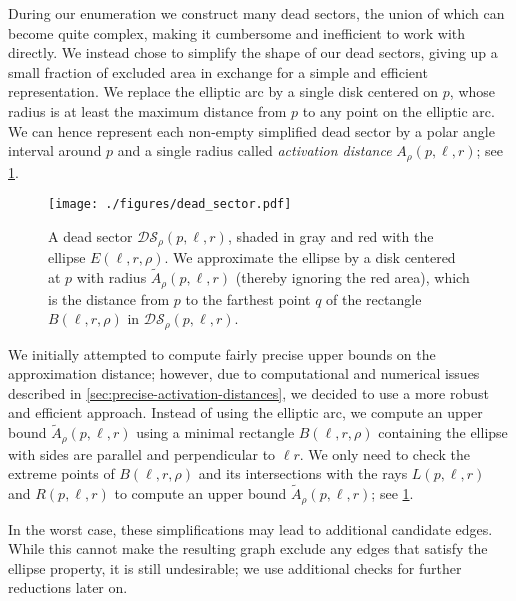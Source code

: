During our enumeration we construct many dead sectors,
the union of which can become quite complex, making it cumbersome and inefficient to work with directly.
We instead chose to simplify the shape of our dead sectors, giving up 
a small fraction of excluded area in exchange for a simple and efficient representation.
We replace the elliptic arc by a single disk centered on $p$,
whose radius is at least the maximum distance from $p$ to any point on the elliptic arc.
We can hence represent each non-empty simplified dead sector by a polar angle interval around $p$ 
and a single radius called \emph{activation distance} $A_{\rho}(p,\ell,r)$; see \cref{fig:dead-sector-construction}.

\begin{figure}
  \centering
  \texttt{[image: ./figures/dead\_sector.pdf]}
  \caption{A dead sector $\mathcal{DS}_{\rho}(p, \ell, r)$, 
  shaded in gray and red with the ellipse $E(\ell, r, \rho)$.
  We approximate the ellipse by a disk centered at $p$ with radius $\tilde{A}_{\rho}(p,\ell,r)$ (thereby ignoring the red area),
  which is the distance from $p$ to the farthest point $q$ of the rectangle 
  $B(\ell, r, \rho)$ in $\mathcal{DS}_{\rho}(p, \ell, r)$.}
  \label{fig:dead-sector-construction}
\end{figure}

We initially attempted to compute fairly precise upper bounds on the approximation distance;
however, due to computational and numerical issues described in \cref{sec:precise-activation-distances},
we decided to use a more robust and efficient approach.
Instead of using the elliptic arc,
we compute an upper bound $\tilde{A}_{\rho}(p,\ell,r)$ using a minimal rectangle $B(\ell, r, \rho)$ containing the ellipse with sides are parallel and perpendicular to $\ell r$.
We only need to check the extreme points of $B(\ell, r, \rho)$ and its intersections with the rays $L(p,\ell,r)$ and $R(p,\ell,r)$ to compute an upper bound $\tilde{A}_{\rho}(p, \ell, r)$; see \cref{fig:dead-sector-construction}.

In the worst case, these simplifications may lead to additional candidate edges. 
While this cannot make the resulting graph exclude any edges that satisfy the ellipse property,
it is still undesirable; we use additional checks for further reductions later on.

